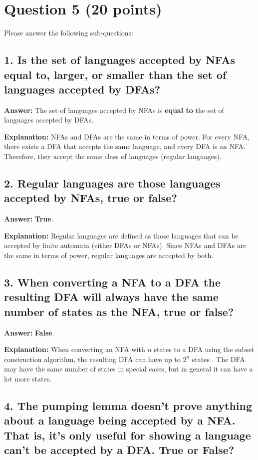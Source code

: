 \documentclass[12pt]{article}
\begin{document}
\newpage

\section*{Question 5 (20 points)}

Please answer the following sub-questions:

\subsection*{1. Is the set of languages accepted by NFAs equal to, larger, or smaller than the set of languages accepted by DFAs?}

\textbf{Answer:} The set of languages accepted by NFAs is \textbf{equal to} the set of languages accepted by DFAs.

\textbf{Explanation:} NFAs and DFAs are the same in terms of power. For every NFA, there exists a DFA that accepts the same language, and every DFA is an NFA. Therefore, they accept the same class of languages (regular languages).

\subsection*{2. Regular languages are those languages accepted by NFAs, true or false?}

\textbf{Answer:} \textbf{True}.

\textbf{Explanation:} Regular languages are defined as those languages that can be accepted by finite automata (either DFAs or NFAs). Since NFAs and DFAs are the same in terms of power, regular languages are accepted by both.

\subsection*{3. When converting a NFA to a DFA the resulting DFA will always have the same number of states as the NFA, true or false?}

\textbf{Answer:} \textbf{False}.

\textbf{Explanation:} When converting an NFA with $n$ states to a DFA using the subset construction algorithm, the resulting DFA can have up to $2^n$ states
. The DFA may have the same number of states in special cases, but in general it can have a lot more states.

\subsection*{4. The pumping lemma doesn't prove anything about a language being accepted by a NFA. That is, it's only useful for showing a language can't be accepted by a DFA. True or False?}
\end{document}
